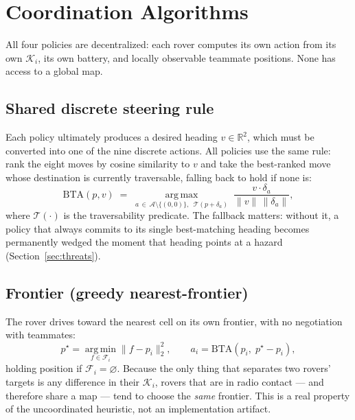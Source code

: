 \documentclass[11pt]{article}
\begin{document}
\section{Coordination Algorithms}
\label{sec:algorithms}

All four policies are decentralized: each rover computes its own action from its
own $\mathcal{K}_i$, its own battery, and locally observable teammate positions.
None has access to a global map.

\subsection{Shared discrete steering rule}

Each policy ultimately produces a desired heading $v \in \mathbb{R}^2$, which
must be converted into one of the nine discrete actions. All policies use the
same rule: rank the eight moves by cosine similarity to $v$ and take the
best-ranked move whose destination is currently traversable, falling back to
hold if none is:
\begin{equation}
\mathrm{BTA}(p, v) \;=\; \operatorname*{arg\,max}_{a \,\in\, \mathcal{A}\setminus\{(0,0)\},\;\; \mathcal{T}(p + \delta_a)}
  \; \frac{v \cdot \delta_a}{\lVert v \rVert\,\lVert \delta_a \rVert},
\label{eq:bta}
\end{equation}
where $\mathcal{T}(\cdot)$ is the traversability predicate. The fallback matters:
without it, a policy that always commits to its single best-matching heading
becomes permanently wedged the moment that heading points at a hazard
(Section~\ref{sec:threats}).

\subsection{Frontier (greedy nearest-frontier)}

The rover drives toward the nearest cell on its own frontier, with no
negotiation with teammates:
\begin{equation}
p^\star = \operatorname*{arg\,min}_{f \in \mathcal{F}_i} \lVert f - p_i \rVert_2^2,
\qquad a_i = \mathrm{BTA}(p_i,\; p^\star - p_i),
\end{equation}
holding position if $\mathcal{F}_i = \varnothing$. Because the only thing that
separates two rovers' targets is any difference in their $\mathcal{K}_i$,
rovers that are in radio contact --- and therefore share a map --- tend to choose
the \emph{same} frontier. This is a real property of the uncoordinated
heuristic, not an implementation artifact.
\end{document}

